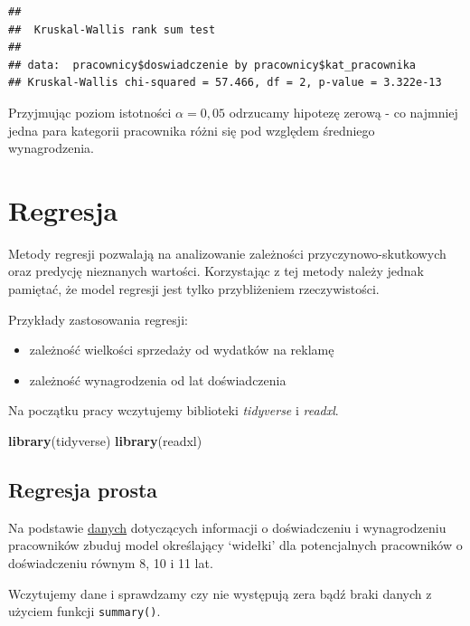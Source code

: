 \documentclass[]{book}
\newenvironment{Shaded}{\begin{snugshade}}{\end{snugshade}}
\newcommand{\KeywordTok}[1]{\textcolor[rgb]{0.13,0.29,0.53}{\textbf{#1}}}
\newcommand{\NormalTok}[1]{#1}
\begin{document}
\begin{verbatim}
## 
##  Kruskal-Wallis rank sum test
## 
## data:  pracownicy$doswiadczenie by pracownicy$kat_pracownika
## Kruskal-Wallis chi-squared = 57.466, df = 2, p-value = 3.322e-13
\end{verbatim}

Przyjmując poziom istotności \(\alpha = 0,05\) odrzucamy hipotezę zerową - co najmniej jedna para kategorii pracownika różni się pod względem średniego wynagrodzenia.

\hypertarget{regresja}{%
\chapter{Regresja}\label{regresja}}

Metody regresji pozwalają na analizowanie zależności przyczynowo-skutkowych oraz predycję nieznanych wartości. Korzystając z tej metody należy jednak pamiętać, że model regresji jest tylko przybliżeniem rzeczywistości.

Przykłady zastosowania regresji:

\begin{itemize}
\item
  zależność wielkości sprzedaży od wydatków na reklamę
\item
  zależność wynagrodzenia od lat doświadczenia
\end{itemize}

Na początku pracy wczytujemy biblioteki \emph{tidyverse} i \emph{readxl}.

\begin{Shaded}
\begin{Highlighting}[]
\KeywordTok{library}\NormalTok{(tidyverse)}
\KeywordTok{library}\NormalTok{(readxl)}
\end{Highlighting}
\end{Shaded}

\hypertarget{regresja-prosta}{%
\section{Regresja prosta}\label{regresja-prosta}}

Na podstawie \href{data/salary.xlsx}{danych} dotyczących informacji o doświadczeniu i wynagrodzeniu pracowników zbuduj model określający `widełki' dla potencjalnych pracowników o doświadczeniu równym 8, 10 i 11 lat.

Wczytujemy dane i sprawdzamy czy nie występują zera bądź braki danych z użyciem funkcji \texttt{summary()}.
\end{document}
